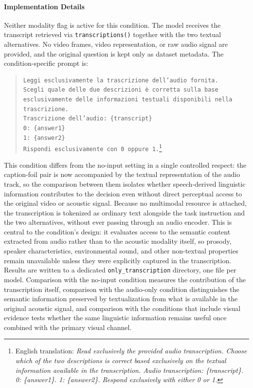 \paragraph{Implementation Details}
Neither modality flag is active for this condition. The model receives the transcript retrieved via \texttt{transcriptions()} together with the two textual alternatives. No video frames, video representation, or raw audio signal are provided, and the original question is kept only as dataset metadata. The condition-specific prompt is:
\begin{quote}
\small
\texttt{Leggi esclusivamente la trascrizione dell'audio fornita.}\\
\texttt{Scegli quale delle due descrizioni è corretta sulla base}\\
\texttt{esclusivamente delle informazioni testuali disponibili nella}\\
\texttt{trascrizione.}\\[0.5em]
\texttt{Trascrizione dell'audio: \{transcript\}}\\[0.5em]
\texttt{0: \{answer1\}}\\
\texttt{1: \{answer2\}}\\[0.5em]
\texttt{Rispondi esclusivamente con 0 oppure 1.}\footnote{English translation: \textit{Read exclusively the provided audio transcription. Choose which of the two descriptions is correct based exclusively on the textual information available in the transcription. Audio transcription: \{transcript\}. 0: \{answer1\}. 1: \{answer2\}. Respond exclusively with either 0 or 1.}}
\end{quote}
This condition differs from the no-input setting in a single controlled respect: the caption-foil pair is now accompanied by the textual representation of the audio track, so the comparison between them isolates whether speech-derived linguistic information contributes to the decision even without direct perceptual access to the original video or acoustic signal.
Because no multimodal resource is attached, the transcription is tokenized as ordinary text alongside the task instruction and the two alternatives, without ever passing through an audio encoder. This is central to the condition's design: it evaluates access to the semantic content extracted from audio rather than to the acoustic modality itself, so prosody, speaker characteristics, environmental sound, and other non-textual properties remain unavailable unless they were explicitly captured in the transcription.
Results are written to a dedicated \texttt{only\_transcription} directory, one file per model. Comparison with the no-input condition measures the contribution of the transcription itself, comparison with the audio-only condition distinguishes the semantic information preserved by textualization from what is available in the original acoustic signal, and comparison with the conditions that include visual evidence tests whether the same linguistic information remains useful once combined with the primary visual channel.
